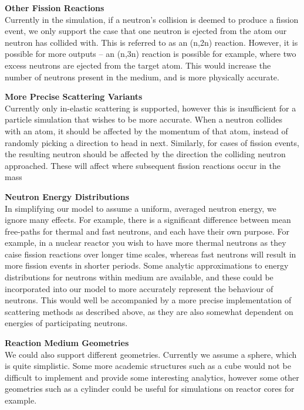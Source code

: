 \noindent\textbf{Other Fission Reactions} \\
Currently in the simulation, if a neutron's collision is deemed to produce a fission event, we only support the case that one neutron 
is ejected from the atom our neutron has collided with. This is referred to as an (n,2n) reaction. However, it is possible 
for more outputs -- an (n,3n) reaction is possible for example, where two excess neutrons are ejected from the target atom. This would 
increase the number of neutrons present in the medium, and is more physically accurate. 

\noindent\textbf{More Precise Scattering Variants} \\
Currently only in-elastic scattering is supported, however this is insufficient for a particle simulation that wishes to be 
more accurate. When a neutron collides 
with an atom, it should be affected by the momentum of that atom, instead of randomly picking a direction to head in next. Similarly, 
for cases of fission events, the resulting neutron should be affected by the direction the colliding neutron approached. These will 
affect where subsequent fission reactions occur in the mass

\noindent\textbf{Neutron Energy Distributions} \\
In simplifying our model to assume a uniform, averaged neutron energy, we ignore many effects. For example, there is a significant difference 
between mean free-paths for thermal and fast neutrons, and each have their own purpose. For example, in a nuclear reactor you wish to have 
more thermal neutrons as they caise fission reactions over longer time scales, whereas fast neutrons will result in more fission events 
in shorter periods. Some analytic approximations to energy distributions for neutrons within medium are available, and these could be incorporated 
into our model to more accurately represent the behaviour of neutrons. This would well be accompanied by a more precise implementation 
of scattering methods as described above, as they are also somewhat dependent on energies of participating neutrons.

\noindent\textbf{Reaction Medium Geometries} \\
We could also support different geometries. Currently we assume a sphere, which is quite simplistic. Some more academic 
structures such as a cube would not be difficult to implement and provide some interesting analytics, however some 
other geometries such as a cylinder could be useful for simulations on reactor cores for example.
